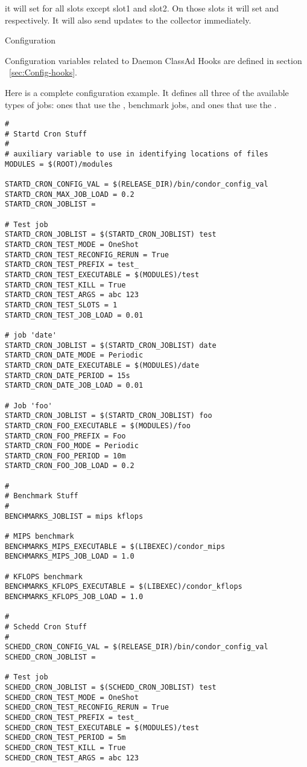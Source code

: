 it will set  for all slots except slot1 and slot2.
On those slots it will set  and 
respectively. It will also send updates to the collector immediately.

\begin{description}
\item[Configuration]
\end{description}

Configuration variables related to Daemon ClassAd Hooks are defined
in section ~\ref{sec:Config-hooks}.

Here is a complete configuration example.
It defines all three of the available types of jobs:
ones that use the , benchmark jobs,
and ones that use the .
\footnotesize
\begin{verbatim}
#
# Startd Cron Stuff
#
# auxiliary variable to use in identifying locations of files
MODULES = $(ROOT)/modules

STARTD_CRON_CONFIG_VAL = $(RELEASE_DIR)/bin/condor_config_val
STARTD_CRON_MAX_JOB_LOAD = 0.2
STARTD_CRON_JOBLIST =

# Test job
STARTD_CRON_JOBLIST = $(STARTD_CRON_JOBLIST) test
STARTD_CRON_TEST_MODE = OneShot
STARTD_CRON_TEST_RECONFIG_RERUN = True
STARTD_CRON_TEST_PREFIX = test_
STARTD_CRON_TEST_EXECUTABLE = $(MODULES)/test
STARTD_CRON_TEST_KILL = True
STARTD_CRON_TEST_ARGS = abc 123
STARTD_CRON_TEST_SLOTS = 1
STARTD_CRON_TEST_JOB_LOAD = 0.01

# job 'date'
STARTD_CRON_JOBLIST = $(STARTD_CRON_JOBLIST) date
STARTD_CRON_DATE_MODE = Periodic
STARTD_CRON_DATE_EXECUTABLE = $(MODULES)/date
STARTD_CRON_DATE_PERIOD = 15s
STARTD_CRON_DATE_JOB_LOAD = 0.01

# Job 'foo'
STARTD_CRON_JOBLIST = $(STARTD_CRON_JOBLIST) foo
STARTD_CRON_FOO_EXECUTABLE = $(MODULES)/foo
STARTD_CRON_FOO_PREFIX = Foo
STARTD_CRON_FOO_MODE = Periodic
STARTD_CRON_FOO_PERIOD = 10m
STARTD_CRON_FOO_JOB_LOAD = 0.2

#
# Benchmark Stuff
#
BENCHMARKS_JOBLIST = mips kflops

# MIPS benchmark
BENCHMARKS_MIPS_EXECUTABLE = $(LIBEXEC)/condor_mips
BENCHMARKS_MIPS_JOB_LOAD = 1.0

# KFLOPS benchmark
BENCHMARKS_KFLOPS_EXECUTABLE = $(LIBEXEC)/condor_kflops
BENCHMARKS_KFLOPS_JOB_LOAD = 1.0

#
# Schedd Cron Stuff 
#
SCHEDD_CRON_CONFIG_VAL = $(RELEASE_DIR)/bin/condor_config_val
SCHEDD_CRON_JOBLIST =

# Test job
SCHEDD_CRON_JOBLIST = $(SCHEDD_CRON_JOBLIST) test
SCHEDD_CRON_TEST_MODE = OneShot
SCHEDD_CRON_TEST_RECONFIG_RERUN = True
SCHEDD_CRON_TEST_PREFIX = test_
SCHEDD_CRON_TEST_EXECUTABLE = $(MODULES)/test
SCHEDD_CRON_TEST_PERIOD = 5m
SCHEDD_CRON_TEST_KILL = True
SCHEDD_CRON_TEST_ARGS = abc 123

\end{verbatim}
\normalsize

